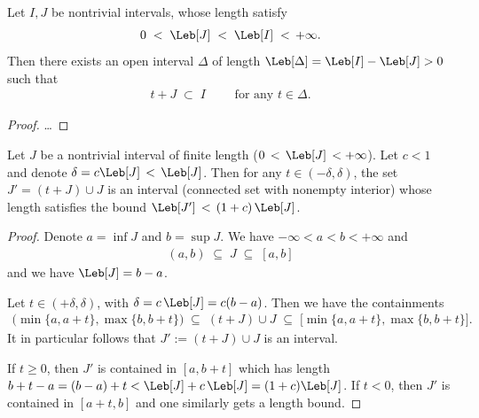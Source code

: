 \begin{lemma}
  \label{lem:shift-interval-contained-in-larger}
  Let $I, J$ be nontrivial intervals, whose length satisfy
  \begin{align*}
    0 \; < \; \Leb[J] \; < \; \Leb[I] \; < \, +\infty .
  \end{align*}
  Then there exists an open interval $\Delta$ of length
  $\Leb[\Delta] = \Leb[I] - \Leb[J] > 0$ such that
  \begin{align*}
    t + J \; \subset \; I
    \qquad \text{ for any $t \in \Delta$.}
  \end{align*}
\end{lemma}
\begin{proof}
  \ldots
\end{proof}

\begin{lemma}
  \label{lem:overlapping-union-interval-copies}
  Let $J$ be a nontrivial interval of finite length ($0 \, < \, \Leb[J] \, < +\infty$).
  Let $c < 1$ and denote $\delta = c \Leb[J] \, < \, \Leb[J]$.
  Then for any $t \in (-\delta,\delta)$, the set
  $J' = (t+J) \cup J$ is an interval (connected set with nonempty interior)
  whose length satisfies the bound $\Leb[J'] \, < \, (1+c) \, \Leb[J]$.
\end{lemma}
\begin{proof}
  Denote $a = \inf J$ and $b = \sup J$. We have $-\infty < a < b < +\infty$ and
  \begin{align*}
    (a,b) \; \subseteq \; J \; \subseteq \; [a,b]
  \end{align*}
  and we have $\Leb[J] = b - a$.

  Let $t \in (+\delta,\delta)$, with $\delta = c \, \Leb[J] = c(b-a)$.
  Then we have the containments
  \begin{align*}
    \big( \min \{a,a+t\} , \max \{b,b+t\} \big)
      \; \subseteq \; (t+J) \cup J
      \; \subseteq \; \big[ \min \{a,a+t\} , \max \{b,b+t\} \big] .
  \end{align*}
  It in particular follows that $J' := (t+J) \cup J$ is an interval.

  If $t \ge 0$, then $J'$ is contained in
  $[a,b+t]$ which has length $b+t-a = (b-a) + t < \Leb[J] + c \, \Leb[J] = (1+c) \Leb[J]$.
  If $t < 0$, then $J'$ is contained in $[a+t,b]$ and one similarly gets a length bound.
\end{proof}


